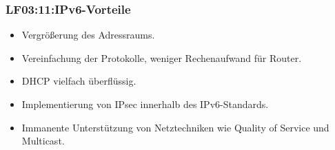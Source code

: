 \begin{frame}
  \frametitle{LF03:11:IPv6-Vorteile}

  \begin{footnotesize}

  \begin{itemize}
    \item Vergrößerung des Adressraums. 
    \item Vereinfachung der Protokolle, weniger Rechenaufwand für Router. 
    \item DHCP vielfach überflüssig.
    \item Implementierung von IPsec innerhalb des IPv6-Standards.
    \item Immanente Unterstützung von Netztechniken wie Quality of Service und Multicast.
  \end{itemize}

\end{footnotesize}

\end{frame}



